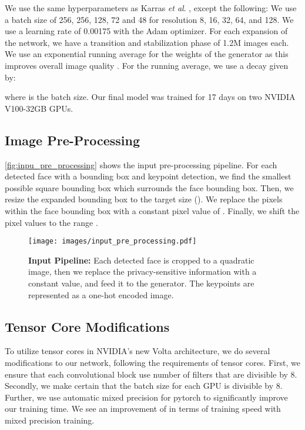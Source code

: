 \documentclass[runningheads]{llncs}
\newcommand{\etal}{\textit{et al}. }
\begin{document}
We use the same hyperparameters as Karras \etal \cite{Karras2017}, except the following:
We use a batch size of 256, 256, 128, 72 and 48 for resolution 8, 16, 32, 64, and 128.
We use a learning rate of 0.00175 with the Adam optimizer.
For each expansion of the network, we have a transition and stabilization phase of 1.2M images each.
We use an exponential running average for the weights of the generator as this improves overall image quality \cite{yazici2018unusual}.
For the running average, we use a decay  given by:



where  is the batch size.
Our final model was trained for 17 days on two NVIDIA V100-32GB GPUs. 

\subsection*{Image Pre-Processing}

\autoref{fig:inpu_pre_processing} shows the input pre-processing pipeline.
For each detected face with a bounding box and keypoint detection, we find the smallest possible square bounding box which surrounds the face bounding box. 
Then, we resize the expanded bounding box to the target size ().
We replace the pixels within the face bounding box with a constant pixel value of .
Finally, we shift the pixel values to the range . 



\begin{figure}
	\centering
	\texttt{[image: images/input\_pre\_processing.pdf]}
	\caption{\textbf{Input Pipeline:} Each detected face is cropped to a quadratic image, then we replace the privacy-sensitive information with a constant value, and feed it to the generator. The keypoints are represented as a one-hot encoded image.}
	\label{fig:inpu_pre_processing}
\end{figure}


\subsection*{Tensor Core Modifications}

To utilize tensor cores in NVIDIA's new Volta architecture, we do several modifications to our network, following the requirements of tensor cores.
First, we ensure that each convolutional block use number of filters that are divisible by 8. 
Secondly, we make certain that the batch size for each GPU is divisible by 8.
Further, we use automatic mixed precision for pytorch \cite{nvidia_apex} to significantly improve our training time.
We see an improvement of  in terms of training speed with mixed precision training.


 

\end{document}

